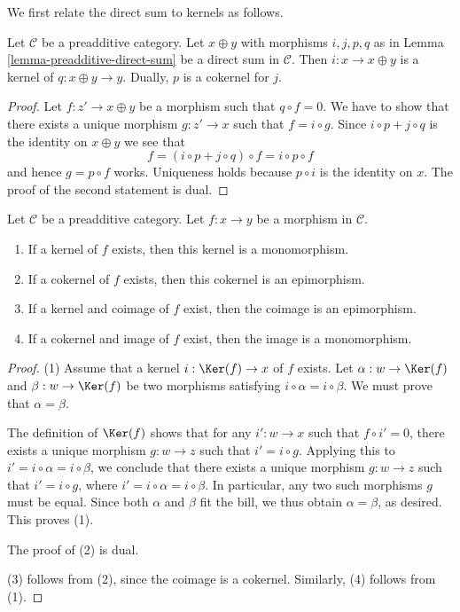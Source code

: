 \noindent
We first relate the direct sum to kernels as follows.

\begin{lemma}
\label{lemma-additive-cat-biproduct-kernel}
Let $\mathcal{C}$ be a preadditive category.
Let $x \oplus y$ with morphisms $i, j, p, q$ as in
Lemma \ref{lemma-preadditive-direct-sum}
be a direct sum in $\mathcal{C}$. Then $i : x \to x \oplus y$
is a kernel of $q : x \oplus y \rightarrow y$. Dually, $p$ is
a cokernel for $j$.
\end{lemma}

\begin{proof}
Let $f : z' \to x \oplus y$ be a morphism such that $q \circ f = 0$.
We have to show that there exists a unique morphism $g : z' \to x$
such that $f = i \circ g$. Since $i \circ p + j \circ q$ is the identity on
$x \oplus y$ we see that
$$
f = (i \circ p + j \circ q) \circ f = i \circ p \circ f
$$
and hence $g = p \circ f$ works. Uniqueness holds because $p \circ i$
is the identity on $x$. The proof of the second statement is dual.
\end{proof}

\begin{lemma}
\label{lemma-kernel-mono}
Let $\mathcal{C}$ be a preadditive category.
Let $f : x \to y$ be a morphism in $\mathcal{C}$.
\begin{enumerate}
\item If a kernel of $f$ exists, then
this kernel is a monomorphism.
\item If a cokernel of $f$ exists, then
this cokernel is an epimorphism.
\item If a kernel and coimage of $f$ exist, then
the coimage is an epimorphism.
\item If a cokernel and image of $f$ exist, then
the image is a monomorphism.
\end{enumerate}
\end{lemma}

\begin{proof}
(1) Assume that a kernel $i : \Ker(f) \to x$ of $f$ exists.
Let $\alpha : w \to \Ker(f)$ and $\beta : w \to \Ker(f)$
be two morphisms satisfying $i \circ \alpha = i \circ \beta$.
We must prove that $\alpha = \beta$.

The definition of $\Ker(f)$ shows that for any
$i' : w \to x$ such that $f \circ i' = 0$, there exists a
unique morphism $g : w \to z$ such that $i' = i \circ g$.
Applying this to $i' = i \circ \alpha = i \circ \beta$,
we conclude that there exists a
unique morphism $g : w \to z$ such that $i' = i \circ g$,
where $i' = i \circ \alpha = i \circ \beta$.
In particular, any two such morphisms $g$ must be equal.
Since both $\alpha$ and $\beta$ fit the bill, we thus
obtain $\alpha = \beta$, as desired.
This proves (1).

The proof of (2) is dual.

(3) follows from (2), since the coimage is a cokernel.
Similarly, (4) follows from (1).
\end{proof}

